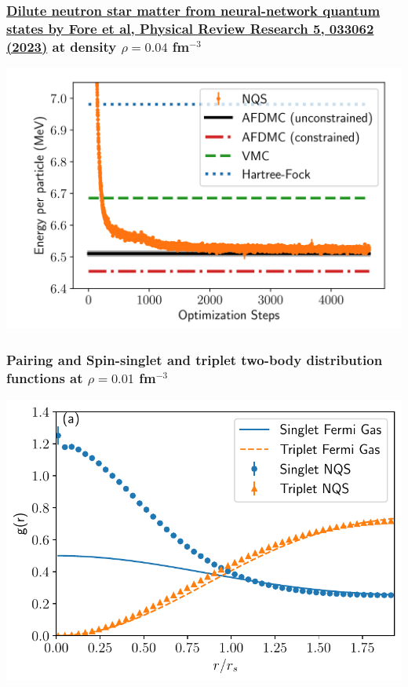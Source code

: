 \documentclass{beamer}
\begin{document}
\begin{frame}
\frametitle{\href{{https://journals.aps.org/prresearch/pdf/10.1103/PhysRevResearch.5.033062}}{Dilute neutron star matter from neural-network quantum states by Fore et al, Physical Review Research 5, 033062 (2023)} at density $\rho=0.04$ fm$^{-3}$}

\begin{block}{}

\vspace{6mm}

\centerline{\includegraphics[width=0.9\linewidth]{figures/nmatter.png}}

\vspace{6mm}

\end{block}
\end{frame}

\begin{frame}
\frametitle{Pairing and Spin-singlet and triplet two-body distribution functions at $\rho=0.01$ fm$^{-3}$}

\begin{block}{}

\vspace{6mm}

\centerline{\includegraphics[width=0.9\linewidth]{figures/01_tbd.pdf}}

\vspace{6mm}

\end{block}
\end{frame}
\end{document}
